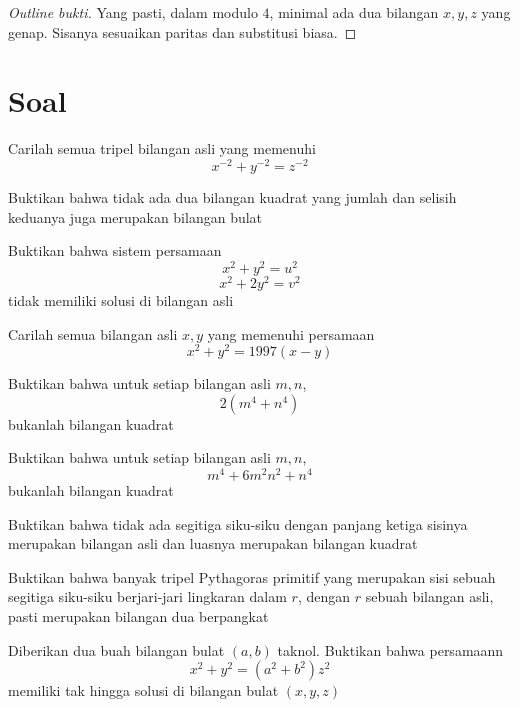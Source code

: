 \documentclass[11pt]{scrartcl}
\begin{document}
\begin{proof}[Outline bukti]
    Yang pasti, dalam modulo $4$, minimal ada dua bilangan $x, y, z$ yang genap. Sisanya sesuaikan paritas dan substitusi biasa.
\end{proof}

\section{Soal}
\begin{problem}
    Carilah semua tripel bilangan asli yang memenuhi \[x^{-2} + y^{-2} = z^{-2}\]
\end{problem}

\begin{problem}
    Buktikan bahwa tidak ada dua bilangan kuadrat yang jumlah dan selisih keduanya juga merupakan bilangan bulat
\end{problem}

\begin{problem}
    Buktikan bahwa sistem persamaan \[x^2 + y^2 = u^2\] \[x^2 + 2y^2 = v^2\] tidak memiliki solusi di bilangan asli
\end{problem}

\begin{problem}
    Carilah semua bilangan  asli $x, y$ yang memenuhi persamaan \[x^2 + y^2 = 1997(x - y)\]
\end{problem}

\begin{problem}
    Buktikan bahwa untuk setiap bilangan asli $m, n$, \[2(m^4 + n^4)\] bukanlah bilangan kuadrat
\end{problem}

\begin{problem}
    Buktikan bahwa untuk setiap bilangan asli $m, n$, \[m^4 + 6m^2n^2 + n^4\] bukanlah bilangan kuadrat
\end{problem}

\begin{problem}
    Buktikan bahwa tidak ada segitiga siku-siku dengan panjang ketiga sisinya merupakan bilangan asli dan luasnya merupakan bilangan kuadrat
\end{problem}

\begin{problem}
    Buktikan bahwa banyak tripel Pythagoras primitif yang merupakan sisi sebuah segitiga siku-siku berjari-jari lingkaran dalam $r$, dengan $r$ sebuah bilangan asli, pasti merupakan bilangan dua berpangkat
\end{problem}

\begin{problem}
    Diberikan dua buah bilangan bulat $(a, b)$ taknol. Buktikan bahwa persamaann \[x^2 + y^2 = (a^2 + b^2)z^2\] memiliki tak hingga solusi di bilangan bulat $(x, y, z)$
\end{problem}
\end{document}
